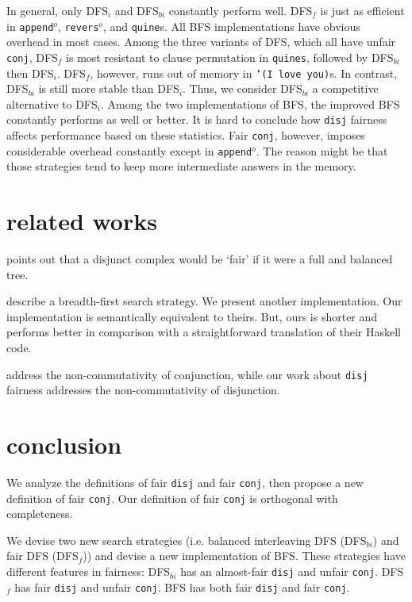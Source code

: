 \documentclass[format=acmlarge, review=true, authordraft=true]{acmart}
\newcommand{\conj}{\texttt{conj}}
\newcommand{\disj}{\texttt{disj}}
\newcommand{\appendo}{\texttt{append$^o$}}
\newcommand{\reverso}{\texttt{revers$^o$}}
\newcommand{\DFSi }[0]{DFS$_{i}$}
\newcommand{\DFSf }[0]{DFS$_{f}$}
\newcommand{\DFSbi}[0]{DFS$_{bi}$}
\newcommand{\BFS}[0]{BFS}
\newcommand{\BFSimp}[0]{the improved BFS}
\begin{document}
In general, only \DFSi{} and \DFSbi{} constantly perform well. \DFSf{}
is just as efficient in \appendo, \reverso, and \texttt{quine}s. All BFS
implementations have obvious overhead in most cases. 
Among the three variants of DFS, which all have unfair \conj{}, \DFSf{} is most 
resistant to clause permutation in \texttt{quines}, followed by \DFSbi{} then 
\DFSi{}. \DFSf{}, however, runs out of memory in \texttt{'(I love you)}s. In 
contrast, \DFSbi{} is still more stable than \DFSi{}. Thus, we consider 
\DFSbi{} a competitive alternative to \DFSi{}.
Among the two implementations of \BFS, \BFSimp{} constantly performs as well 
or better. 
It is hard to conclude how \disj{} fairness affects performance based on these 
statistics.
Fair \conj{}, however, imposes considerable overhead constantly except in 
\appendo. The reason might be that those strategies tend to keep more 
intermediate answers in the memory.

\section{related works}

\citet{yang2010adventures} points out that a disjunct complex would be `fair' 
if it were a full and balanced tree.

\citet{seres1999algebra} describe a breadth-first search 
strategy. We present another implementation. Our implementation is semantically 
equivalent to theirs. But, ours is shorter and performs better in comparison 
with a straightforward translation of their Haskell code.

\citet{rozplokhas2018improving} address the non-commutativity of conjunction, 
while our work about \disj{} fairness addresses the non-commutativity of 
disjunction.

\section{conclusion}

We analyze the definitions of fair \disj{} and fair \conj{}, then propose a 
new definition of fair \conj{}. Our definition of fair \conj{} is orthogonal 
with completeness.

We devise two new search strategies (i.e. balanced interleaving DFS 
(\DFSbi{}) and fair DFS (\DFSf{})) and devise a new 
implementation of \BFS. These strategies have different features 
in fairness: \DFSbi{} has an almost-fair \disj{} and unfair \conj{}. 
\DFSf{} has fair \disj{} and unfair \conj{}. \BFS{} has both fair
\disj{} and fair \conj{}.
\end{document}
